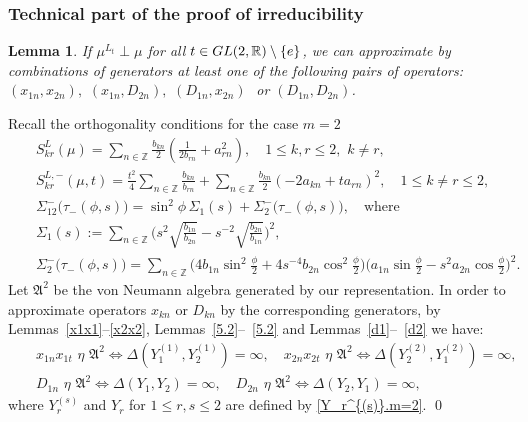 \documentclass[preprint,12pt]{elsarticle}
\newtheorem{lem}[thm]{Lemma}
\numberwithin{equation}{section}
\begin{document}
\subsubsection{Technical part of the proof of irreducibility}
%
\label{sec.3.2}
%
\begin{lem}
\label{approx-(x,D).2} If $\mu^{L_t}\perp\mu$ for all $t\in
{\rm GL}(2,{\mathbb R})\setminus\{e\}$, we can approximate 
by combinations of generators 
at least one of
the following  pairs of operators:
$(x_{1n},x_{2n}),\,\,(x_{1n},D_{2n}),\,\,(D_{1n},x_{2n})\,\,$ or
$(D_{1n},D_{2n})$.
\end{lem}
\begin{pf} 
Recall the orthogonality conditions for the case $m=2$ 
%
\begin{eqnarray*}
&&
S^L_{kr}(\mu)=\sum_{n\in {\mathbb Z}}
\frac{b_{kn}}{2}\left(\frac{1}{2b_{rn}}+a_{rn}^2\right),\quad 1\leq k,r\leq 2,\,\, k\not=r,\\
&&
S^{L,-}_{kr}(\mu,t)=\frac{t^2}{4}\sum_{n\in{\mathbb
Z}}\frac{b_{kn}}{b_{rn}}+ \sum_{n\in{\mathbb
Z}}\frac{b_{kn}}{2}(-2a_{kn}+ta_{rn})^2,\quad 1\leq k\not=r\leq 2,\\
%
&&\Sigma^-_{12}\big(\tau_{-}(\phi,s)\big)=\sin^2\phi\,\Sigma_1(s)+\Sigma^-_2\big(\tau_{-}(\phi,s)\big),\quad\text{where}\\
&&
\Sigma_1(s):=\!\sum_{n\in {\mathbb Z}}
\Big(s^2\sqrt{\frac{b_{1n}}{b_{2n}}}\!-\!s^{-2}\sqrt{\frac{b_{2n}}{b_{1n}}}\Big)^2,\\ 
&&
\Sigma^-_2\big(\tau_{-}(\phi,s)\big)\!=\!\sum_{n\in
{\mathbb
Z}}\Big(4b_{1n}\sin^2\frac{\phi}{2}\!+\!4s^{-4}b_{2n}\cos^2\frac{\phi}{2}\Big)
\Big(a_{1n}\sin\frac{\phi}{2}\!-\!s^2a_{2n}\cos\frac{\phi}{2}\Big)^2.
\end{eqnarray*}
Let ${\mathfrak A}^2$ be the von Neumann algebra generated by our representation. 
%
In order to approximate
operators  $x_{kn}$ or $D_{kn}$  by the corresponding generators,
by Lemmas~\ref{x1x1}--\ref{x2x2}, Lemmas~\ref{5.2}--~\ref{5.2} and Lemmas~\ref{d1}--~\ref{d2} we have:
\begin{eqnarray*}  
&& x_{1n}x_{1t}\,\,\eta\,\, {\mathfrak A}^2\Leftrightarrow 
\Delta(Y_1^{(1)},Y_2^{(1)})=\infty,\quad
x_{2n}x_{2t}\,\,\eta\,\, {\mathfrak A}^2\Leftrightarrow 
\Delta(Y_2^{(2)},Y_1^{(2)})=\infty,\\
&& D_{1n}\,\,\eta\,\, {\mathfrak A} ^2\Leftrightarrow \Delta(Y_1,Y_2)=\infty,\quad 
D_{2n}\,\,\eta\,\, {\mathfrak A}^2\Leftrightarrow \Delta(Y_2,Y_1)=\infty,
\end{eqnarray*}
where $Y_r^{(s)}$ and $Y_r$ for $1\leq r,s\leq 2$ are defined by \eqref{Y_r^{(s)}.m=2}.
\qed\end{pf}
\end{document}
